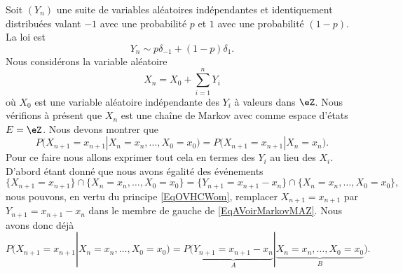 Soit \( (Y_n)\) une suite de variables aléatoires indépendantes et identiquement distribuées valant \( -1\) avec une probabilité \( p\) et \( 1\) avec une probabilité \( (1-p)\). La loi est
\begin{equation}
    Y_n\sim p\delta_{-1}+(1-p)\delta_{1}.
\end{equation}
Nous considérons la variable aléatoire
\begin{equation}
    X_n=X_0+\sum_{i=1}^nY_i
\end{equation}
où \( X_0\) est une variable aléatoire indépendante des \( Y_i\) à valeurs dans \( \eZ\). Nous vérifions à présent que \( X_n\) est une chaîne de Markov avec comme espace d'états \( E=\eZ\). Nous devons montrer que
\begin{equation}        \label{EqAVoirMarkovMAZ}
    P\big( X_{n+1}=x_{n+1}| X_n=x_n,\ldots,X_0=x_0 \big)=P\big( X_{n+1}=x_{n+1}|X_n=x_n \big).
\end{equation}
Pour ce faire nous allons exprimer tout cela en termes des \( Y_i\) au lieu des \( X_i\). D'abord étant donné que nous avons égalité des événements
\begin{equation}
    \{ X_{n+1}=x_{n+1} \}\cap\{ X_n=x_n,\ldots, X_0=x_0 \}= \{ Y_{n+1}=x_{n+1}-x_n \}\cap\{X_n=x_n,\ldots, X_0=x_0\},
\end{equation}
nous pouvons, en vertu du principe \eqref{EqOVHCWom}, remplacer \( X_{n+1}=x_{n+1}\) par \( Y_{n+1}=x_{n+1}-x_n\) dans le membre de gauche de \eqref{EqAVoirMarkovMAZ}. Nous avons donc déjà
\begin{equation}      
    P\big( X_{n+1}=x_{n+1}| X_n=x_n,\ldots,X_0=x_0 \big)=P\big( \underbrace{Y_{n+1}=x_{n+1}-x_n}_{A}| \underbrace{X_n=x_n,\ldots,X_0=x_0}_{B} \big).
\end{equation}


